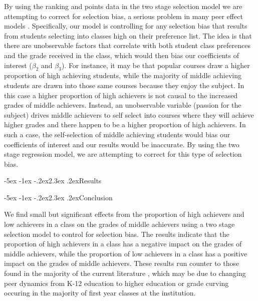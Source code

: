 \documentclass[12pt,a4paper,english,fleqn]{article}
\makeatletter
\renewcommand\section{\@startsection{section}{1}{\z@}
{-5ex \@plus -1ex \@minus -.2ex}{2.3ex \@plus.2ex}{\normalfont\large\bf}}
\makeatother
\begin{document}
By using the ranking and points data in the two stage selection model we are attempting to correct for selection bias, a serious problem in many peer effect models \citep{carman2012classroom,burke2013classroom,ding2007peers}. 
Specifically, our model is controlling for any selection bias that results from students selecting into classes high on their preference list. 
The idea is that there are unobservable factors that correlate with both student class preferences and the grade received in the class, which would then bias our coefficients of interest ($\beta_{2}$ and $\beta_{3}$). 
For instance, it may be that popular courses draw a higher proportion of high achieving students, while the majority of middle achieving students are drawn into those same courses because they enjoy the subject. 
In this case a higher proportion of high achievers is not causal to the increased grades of middle achievers. 
Instead, an unobservable variable (passion for the subject) drives middle achievers to self select into courses where they will achieve higher grades and there happen to be a higher proportion of high achievers. 
In such a case, the self-selection of middle achieving students would bias our coefficients of interest and our results would be inaccurate.
By using the two stage regression model, we are attempting to correct for this type of selection bias.

\section{Results}\label{results}



\section{Conclusion}\label{Conclusion}
      
We find small but significant effects from the proportion of high achievers and low achievers in a class on the grades of middle achievers using a two stage selection model to control for selection bias. 
The results indicate that the proportion of high achievers in a class has a negative impact on the grades of middle achievers, while the proportion of low achievers in a class has a positive impact on the grades of middle achievers. 
These results run counter to those found in the majority of the current literature \citep{kang2007classroom,carman2012classroom,burke2013classroom,schlosser2008inside,lavy2012good}, which may be due to changing peer dynamics from K-12 education to higher education or grade curving occuring in the majority of first year classes at the institution. 

       
\newpage{}

\singlespacing


\end{document}
